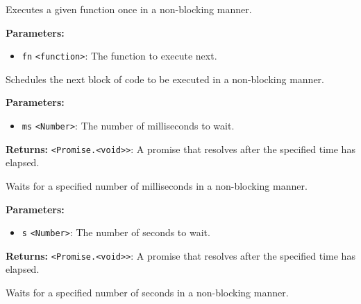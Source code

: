 \documentclass[12pt,a4paper]{article}
\begin{document}
\noindent Executes a given function once in a non-blocking manner.

\vspace{5mm}
\noindent {}


\noindent \textbf{Parameters:}
\begin{itemize}
  \item \texttt{fn} \texttt{<function>}: The function to execute next.
\end{itemize}

\noindent Schedules the next block of code to be executed in a non-blocking manner.

\vspace{5mm}
\noindent {}


\noindent \textbf{Parameters:}
\begin{itemize}
  \item \texttt{ms} \texttt{<Number>}: The number of milliseconds to wait.
\end{itemize}

\noindent \textbf{Returns:} \texttt{<Promise.<void>>}: A promise that resolves after the specified time has elapsed.

\noindent Waits for a specified number of milliseconds in a non-blocking manner.

\vspace{5mm}
\noindent {}


\noindent \textbf{Parameters:}
\begin{itemize}
  \item \texttt{s} \texttt{<Number>}: The number of seconds to wait.
\end{itemize}

\noindent \textbf{Returns:} \texttt{<Promise.<void>>}: A promise that resolves after the specified time has elapsed.

\noindent Waits for a specified number of seconds in a non-blocking manner.

\vspace{5mm}
\noindent {}
\end{document}
